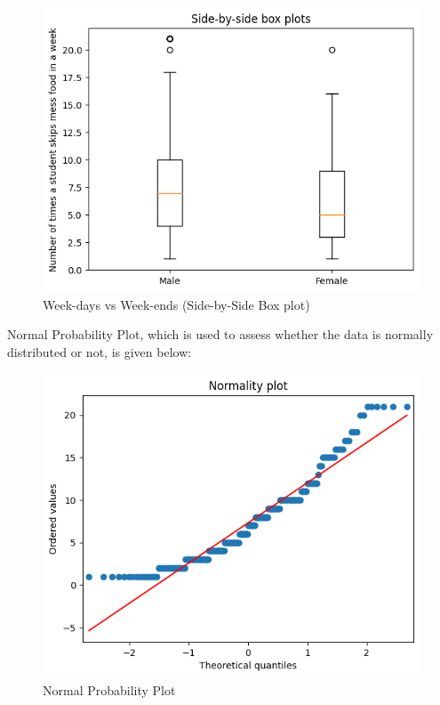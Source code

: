 \documentclass{article}
\begin{document}
\begin{figure}[H]
    \centering
    \includegraphics[scale = 0.9]{side-by-side.png}
    \caption{Week-days vs Week-ends (Side-by-Side Box plot)}  
    \label{fig:side-by-side}
\end{figure}
Normal Probability Plot, which is used to assess whether the data is normally distributed or not, is given below:
\begin{figure}[H]
    \centering
    \includegraphics[scale = 0.9]{normality_plot.png}
    \caption{Normal Probability Plot}  
    \label{Normality_plot}
\end{figure}
\end{document}
